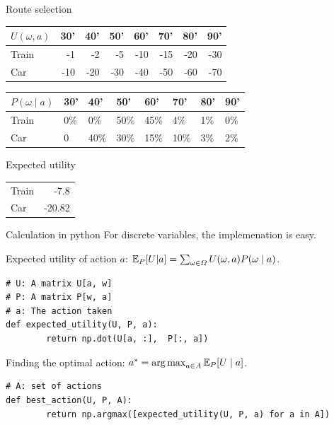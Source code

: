 \documentclass[smaller]{beamer}
\begin{document}
\begin{frame}[label={sec:org1b6de3e}]{Route selection}
\begin{example}[Utility]
\begin{center}
\begin{tabular}{l|rrrrrrr}
\hline
\(U(\omega, a)\) & 30' & 40' & 50' & 60' & 70' & 80' & 90'\\[0pt]
\hline
Train & -1 & -2 & -5 & -10 & -15 & -20 & -30\\[0pt]
Car & -10 & -20 & -30 & -40 & -50 & -60 & -70\\[0pt]
\hline
\end{tabular}
\end{center}

\pause
\end{example}
\begin{example}[Probability]
\begin{center}
\begin{tabular}{l|lllllll}
\hline
\(P(\omega \mid a)\) & 30' & 40' & 50' & 60' & 70' & 80' & 90'\\[0pt]
\hline
Train & 0\% & 0\% & 50\% & 45\% & 4\% & 1\% & 0\%\\[0pt]
Car & 0 & 40\% & 30\% & 15\% & 10\% & 3\% & 2\%\\[0pt]
\hline
\end{tabular}
\end{center}

\pause
\end{example}
\begin{block}{Expected utility}
\begin{center}
\begin{tabular}{l|r}
Train & -7.8\\[0pt]
Car & -20.82\\[0pt]
\end{tabular}
\end{center}
\end{block}
\end{frame}

\begin{frame}[label={sec:org13f9f24},fragile]{Calculation in python}
 For discrete variables, the implemenation is easy.
\pause
\begin{block}{Expected utility of action \(a\): \(\mathop{\mbox{\ensuremath{\mathbb{E}}}}\nolimits_P[U |a] = \sum_{\omega \in \Omega} U(\omega, a) P(\omega \mid a)\).}
\begin{verbatim}
# U: A matrix U[a, w]
# P: A matrix P[w, a]
# a: The action taken
def expected_utility(U, P, a):
        return np.dot(U[a, :],  P[:, a])
\end{verbatim}
\end{block}
\begin{block}{Finding the optimal action: \(a^* = \operatorname*{arg\,max}_{a \in A} \mathop{\mbox{\ensuremath{\mathbb{E}}}}\nolimits_P[U \mid a]\).}
\begin{verbatim}
# A: set of actions
def best_action(U, P, A):
        return np.argmax([expected_utility(U, P, a) for a in A])
\end{verbatim}
\end{block}
\end{frame}
\end{document}
